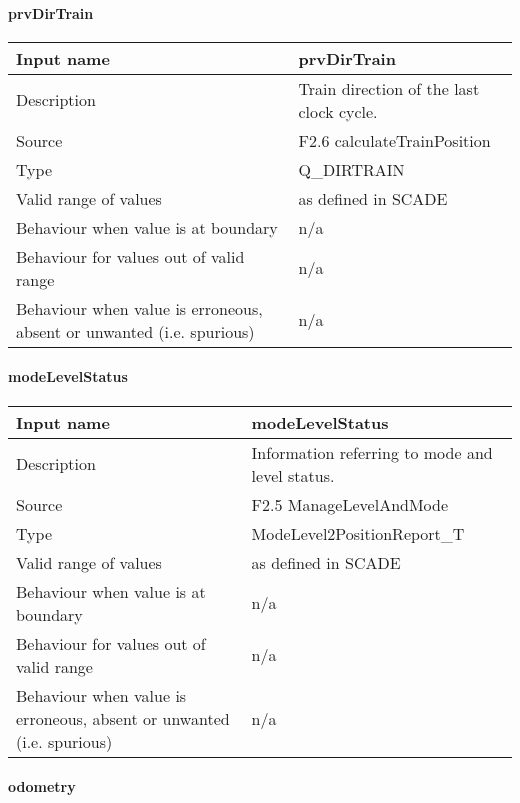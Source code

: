 \paragraph{prvDirTrain}

\begin{longtable}{p{}p{}}
\toprule
Input name				& prvDirTrain \\
\midrule
Description				& Train direction of the last clock cycle. \\
\midrule
Source					& F2.6 calculateTrainPosition \\ 
\midrule
Type					& Q\_DIRTRAIN \\
\midrule
Valid range of values	& as defined in SCADE \\
\midrule
Behaviour when value is at boundary	& n/a \\
\midrule
Behaviour for values out of valid range	& n/a \\
\midrule
Behaviour when value is erroneous, absent or unwanted (i.e. spurious) & n/a \\
\bottomrule
\end{longtable}

\paragraph{modeLevelStatus}

\begin{longtable}{p{}p{}}
\toprule
Input name				& modeLevelStatus \\
\midrule
Description				& Information referring to mode and level status. \\
\midrule
Source					& F2.5 ManageLevelAndMode \\ 
\midrule
Type					& ModeLevel2PositionReport\_T \\
\midrule
Valid range of values	& as defined in SCADE \\
\midrule
Behaviour when value is at boundary	& n/a \\
\midrule
Behaviour for values out of valid range	& n/a \\
\midrule
Behaviour when value is erroneous, absent or unwanted (i.e. spurious) & n/a \\
\bottomrule
\end{longtable}

\paragraph{odometry}

